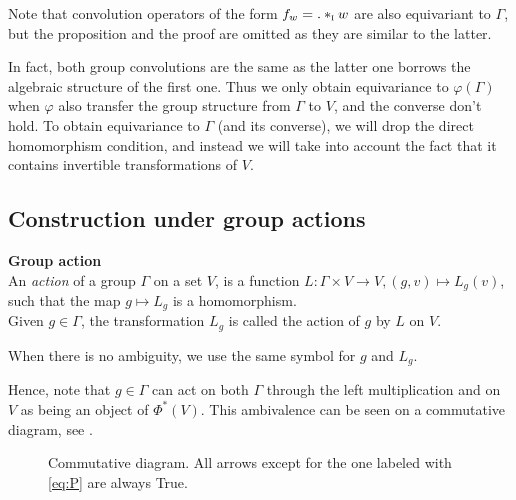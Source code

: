 \begin{remark}Note that convolution operators of the form $f_w = . \ast_{\operatorname{\textsc{i}}} w$ are also equivariant to $\Gamma$, but the proposition and the proof are omitted as they are similar to the latter.
\end{remark}

In fact, both group convolutions are the same as the latter one borrows the algebraic structure of the first one. Thus we only obtain equivariance to $\varphi(\Gamma)$ when $\varphi$ also transfer the group structure from $\Gamma$ to $V$, and the converse don't hold. To obtain equivariance to $\Gamma$ (and its converse), we will drop the direct homomorphism condition, and instead we will take into account the fact that it contains invertible transformations of $V$.

\subsection{Construction under group actions}

\begin{definition}\textbf{Group action}\\
An \emph{action} of a group $\Gamma$ on a set $V$, is a function $L: \Gamma \times V \rightarrow V, (g,v) \mapsto L_g(v)$, such that the map $g \mapsto L_g$ is a homomorphism.\\
Given $g \in \Gamma$, the transformation $L_g$ is called the action of $g$ by $L$ on $V$.
\end{definition}

\begin{remark}
When there is no ambiguity, we use the same symbol for $g$ and $L_g$. 
\end{remark}

Hence, note that $g \in \Gamma$ can act on both $\Gamma$ through the left multiplication and on $V$ as being an object of $\Phi^{*}(V)$. This ambivalence can be seen on a commutative diagram, see .%

\begin{figure}[H]
\centering
{}
\caption{Commutative diagram. All arrows except for the one labeled with \eqref{eq:P} are always True.}
\label{fig:com}
\end{figure}

